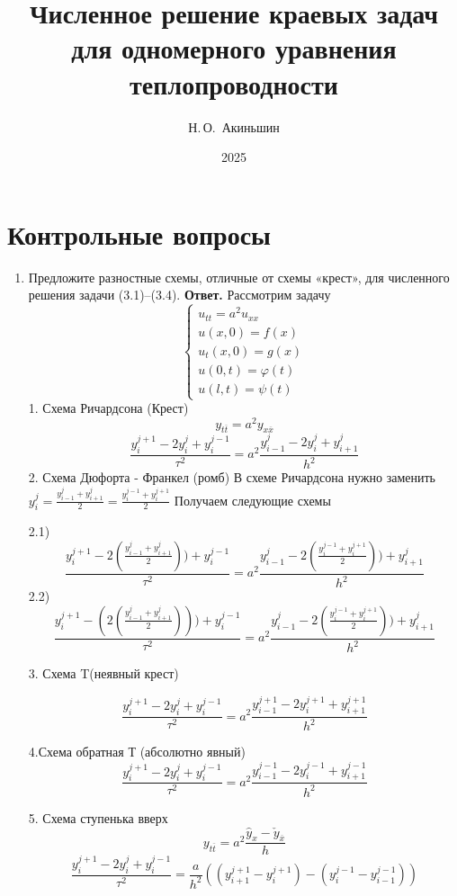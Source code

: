 \documentclass{article}
\title{Численное решение краевых задач для одномерного уравнения теплопроводности}
\author{Н.\,О.~Акиньшин}
\date{2025}
\begin{document}
    \maketitle
    \newpage
    \tableofcontents
    \newpage

    \section{Контрольные вопросы}
	\begin{enumerate}
		\item Предложите разностные схемы, отличные от схемы «крест»,
		для численного решения задачи (3.1)–(3.4).
		\newline 
		{\bfseries Ответ. } 
		Рассмотрим задачу 
		\begin{equation*}
			\begin{cases}
				u_{tt} = a^2 u _{xx} \\
				u(x, 0) = f(x) \\
				u_t(x, 0) =  g(x) \\ 
				u(0, t) = \varphi(t) \\ 
				u(l, t) = \psi(t)
			\end{cases}
		\end{equation*}
		1. Схема Ричардсона (Крест)
		\[
		y_{t\overline{t}} = a^2 y_ {x\overline{x}}
		\]
		\[
		\frac{y_{i}^{j+1}-2y_i^{j}+y_i^{j-1}}{\tau^2} = a^2\frac{y_{i-1}^j -2y_i^j +y_{i+1}^j}{h^2}
		\]
		2. Схема Дюфорта - Франкел (ромб)
		В схеме Ричардсона нужно заменить $y_i^j = \frac{y_{i-1}^j + y_{i+1}^j}{2} = \frac{y_{i}^{j-1} + y_{i}^{j+1}}{2}$
		Получаем следующие схемы
		
		
		2.1) 
		\[
		\frac{y_{i}^{j+1}-2(\frac{y_{i-1}^j + y_{i+1}^j}{2}))+y_i^{j-1}}{\tau^2} = a^2\frac{y_{i-1}^j -2(\frac{y_{i}^{j-1} + y_{i}^{j+1}}{2})) +y_{i+1}^j}{h^2}
		\]
		2.2) 
		\[
		\frac{y_{i}^{j+1}-(2(\frac{y_{i-1}^j + y_{i+1}^j}{2})))+y_i^{j-1}}{\tau^2} = a^2\frac{y_{i-1}^j -2(\frac{y_{i}^{j-1} + y_{i}^{j+1}}{2})) +y_{i+1}^j}{h^2}
		\]
		
		
		3. Схема T(неявный крест)
		
		\[
		\frac{y_{i}^{j+1}-2y_i^{j}+y_i^{j-1}}{\tau^2} = a^2\frac{y_{i-1}^{j+1} -2y_i^{j+1} +y_{i+1}^{j+1}}{h^2}
		\]
		
		
		4.Схема обратная Т (абсолютно явный)
		\[
		\frac{y_{i}^{j+1}-2y_i^{j}+y_i^{j-1}}{\tau^2} = a^2\frac{y_{i-1}^{j-1} -2y_i^{j-1} +y_{i+1}^{j-1}}{h^2}
		\]
		
		
		5. Схема ступенька вверх
		\[
		y_{t\overline{t}} = a^2 \frac{\hat{y}_x - \check{y}_{\overline{x}}}{h}
		\]
		\[
		\frac{y_{i}^{j+1}-2y_i^{j}+y_i^{j-1}}{\tau^2} = \frac{a}{h^2} ((y_{i+1}^{j+1}-y_{i}^{j+1}) -(y_i^{j-1}- y_{i-1}^{j-1}))
		\]
		

\end{enumerate}
\end{document}
